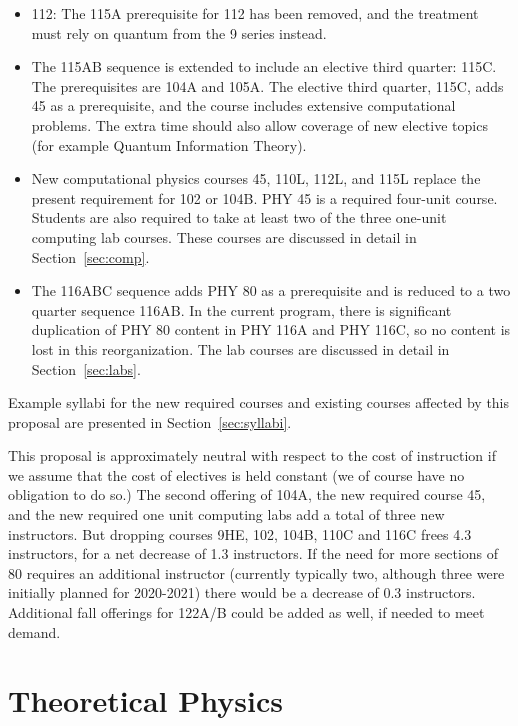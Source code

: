 \documentclass[12pt]{article}
\begin{document}
\begin{itemize}
\item 112: The 115A prerequisite for 112 has been removed, and the
  treatment must rely on quantum from the 9 series instead.

\item The 115AB sequence is extended to include an elective third
  quarter: 115C.  The prerequisites are 104A and 105A.  The elective
  third quarter, 115C, adds 45 as a prerequisite, and the course
  includes extensive computational problems.  The extra time should
  also allow coverage of new elective topics (for example Quantum
  Information Theory).

\item New computational physics courses 45, 110L, 112L, and 115L
  replace the present requirement for 102 or 104B.  PHY 45 is a
  required four-unit course.  Students are also required to take at
  least two of the three one-unit computing lab courses. These courses
  are discussed in detail in Section~\ref{sec:comp}.

\item The 116ABC sequence adds PHY 80 as a prerequisite and is reduced
  to a two quarter sequence 116AB.  In the current program, there is
  significant duplication of PHY 80 content in PHY 116A and PHY 116C,
  so no content is lost in this reorganization.  The lab courses are
  discussed in detail in Section~\ref{sec:labs}.
\end{itemize}
Example syllabi for the new required courses and existing courses
affected by this proposal are presented in Section~\ref{sec:syllabi}.

This proposal is approximately neutral with respect to the cost of
instruction if we assume that the cost of electives is held constant
(we of course have no obligation to do so.)  The second offering of
104A, the new required course 45, and the new required one unit
computing labs add a total of three new instructors.  But dropping
courses 9HE, 102, 104B, 110C and 116C frees 4.3 instructors, for a net
decrease of 1.3 instructors.  If the need for more sections of 80
requires an additional instructor (currently typically two, although
three were initially planned for 2020-2021) there would be a decrease
of 0.3 instructors.  Additional fall offerings for 122A/B could be
added as well, if needed to meet demand.

\section{Theoretical Physics}
\label{sec:theory}
\end{document}
